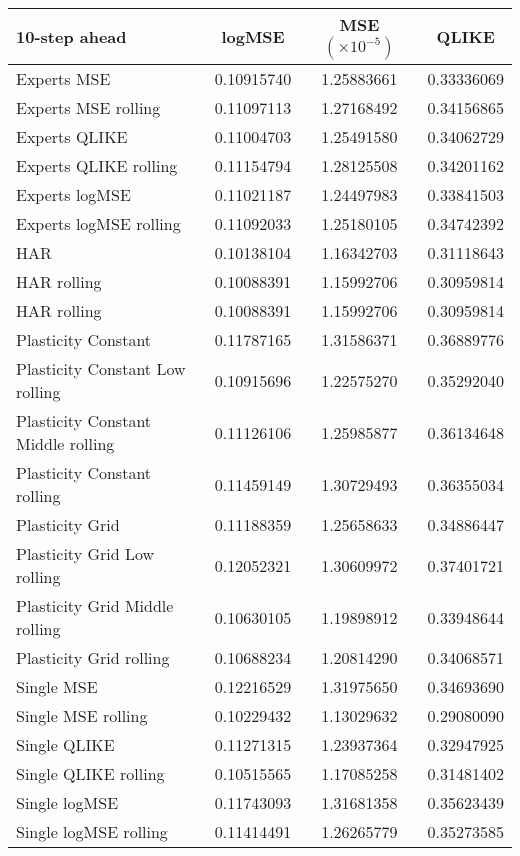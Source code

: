 
\begin{tabular}{l|c|c|c}
10-step ahead     & logMSE & MSE $(\times 10^{-5})$ & QLIKE \\\hline
Experts MSE & 0.10915740 & 1.25883661 & 0.33336069\\ 
Experts MSE rolling & 0.11097113 & 1.27168492 & 0.34156865\\ 
Experts QLIKE & 0.11004703 & 1.25491580 & 0.34062729\\ 
Experts QLIKE rolling & 0.11154794 & 1.28125508 & 0.34201162\\ 
Experts logMSE & 0.11021187 & 1.24497983 & 0.33841503\\ 
Experts logMSE rolling & 0.11092033 & 1.25180105 & 0.34742392\\ 
HAR & 0.10138104 & 1.16342703 & 0.31118643\\ 
HAR rolling & 0.10088391 & 1.15992706 & 0.30959814\\ 
HAR rolling & 0.10088391 & 1.15992706 & 0.30959814\\ 
Plasticity Constant & 0.11787165 & 1.31586371 & 0.36889776\\ 
Plasticity Constant Low rolling & 0.10915696 & 1.22575270 & 0.35292040\\ 
Plasticity Constant Middle rolling & 0.11126106 & 1.25985877 & 0.36134648\\ 
Plasticity Constant rolling & 0.11459149 & 1.30729493 & 0.36355034\\ 
Plasticity Grid & 0.11188359 & 1.25658633 & 0.34886447\\ 
Plasticity Grid Low rolling & 0.12052321 & 1.30609972 & 0.37401721\\ 
Plasticity Grid Middle rolling & 0.10630105 & 1.19898912 & 0.33948644\\ 
Plasticity Grid rolling & 0.10688234 & 1.20814290 & 0.34068571\\ 
Single MSE & 0.12216529 & 1.31975650 & 0.34693690\\ 
Single MSE rolling & 0.10229432 & 1.13029632 & 0.29080090\\ 
Single QLIKE & 0.11271315 & 1.23937364 & 0.32947925\\ 
Single QLIKE rolling & 0.10515565 & 1.17085258 & 0.31481402\\ 
Single logMSE & 0.11743093 & 1.31681358 & 0.35623439\\ 
Single logMSE rolling & 0.11414491 & 1.26265779 & 0.35273585\\ 
\end{tabular}